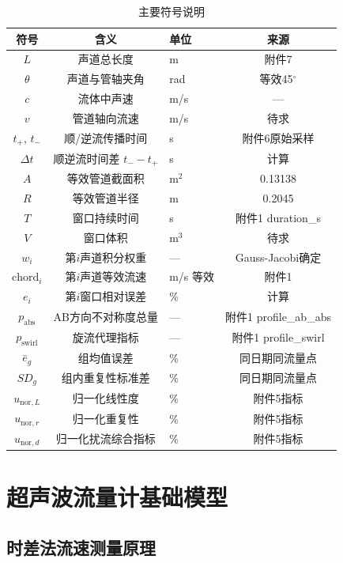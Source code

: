 \begin{table}[H]
\centering
\caption{主要符号说明}
\label{tab:symbols}
\begin{tabular}{cclc}
\toprule
符号 & 含义 & 单位 & 来源 \\
\midrule
$L$ & 声道总长度 & m & 附件7 \\
$\theta$ & 声道与管轴夹角 & rad & 等效45$^\circ$ \\
$c$ & 流体中声速 & m/s & — \\
$v$ & 管道轴向流速 & m/s & 待求 \\
$t_+$, $t_-$ & 顺/逆流传播时间 & s & 附件6原始采样 \\
$\Delta t$ & 顺逆流时间差 $t_- - t_+$ & s & 计算 \\
$A$ & 等效管道截面积 & m$^2$ & 0.13138 \\
$R$ & 等效管道半径 & m & 0.2045 \\
$T$ & 窗口持续时间 & s & 附件1 duration\_s \\
$V$ & 窗口体积 & m$^3$ & 待求 \\
$w_i$ & 第$i$声道积分权重 & — & Gauss-Jacobi确定 \\
$\text{chord}_i$ & 第$i$声道等效流速 & m/s 等效 & 附件1 \\
$e_i$ & 第$i$窗口相对误差 & \% & 计算 \\
$p_{\text{abs}}$ & AB方向不对称度总量 & — & 附件1 profile\_ab\_abs \\
$p_{\text{swirl}}$ & 旋流代理指标 & — & 附件1 profile\_swirl \\
$\bar{e}_g$ & 组均值误差 & \% & 同日期同流量点 \\
$SD_g$ & 组内重复性标准差 & \% & 同日期同流量点 \\
$u_{\text{nor},L}$ & 归一化线性度 & \% & 附件5指标 \\
$u_{\text{nor},r}$ & 归一化重复性 & \% & 附件5指标 \\
$u_{\text{nor},d}$ & 归一化扰流综合指标 & \% & 附件5指标 \\
\bottomrule
\end{tabular}
\end{table}

\section{超声波流量计基础模型}

\subsection{时差法流速测量原理}

